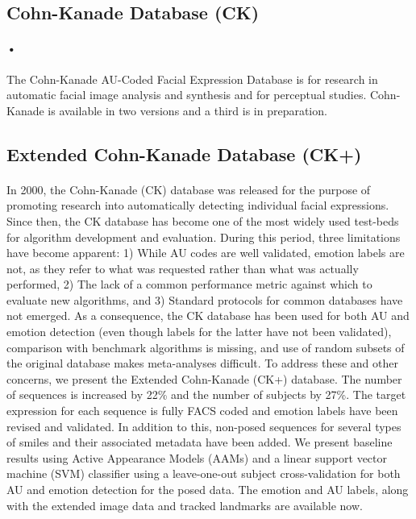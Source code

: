 \documentclass[a4paper,12pt,oneside]{article}
\begin{document}
\subsection{Cohn-Kanade Database (CK)}

\paragraph{•}
The Cohn-Kanade AU-Coded Facial Expression Database is for research in automatic facial image analysis and synthesis and for perceptual studies. Cohn-Kanade is available in two versions and a third is in preparation.



\subsection{Extended Cohn-Kanade Database (CK+)}
\paragraph{}
In 2000, the Cohn-Kanade (CK) database was released for the purpose of promoting research into automatically detecting individual facial expressions. Since then, the CK database has become one of the most widely used test-beds for algorithm development and evaluation. During this period, three limitations have become apparent: 1) While AU codes are well validated, emotion labels are not, as they refer to what was requested rather than what was actually performed, 2) The lack of a common performance metric against which to evaluate new algorithms, and 3) Standard protocols for common databases have not emerged. As a consequence, the CK database has been used for both AU and emotion detection (even though labels for the latter have not been validated), comparison with benchmark algorithms is missing, and use of random subsets of the original database makes meta-analyses difficult. To address these and other concerns, we present the Extended Cohn-Kanade (CK+) database. The number of sequences is increased by 22\% and the number of subjects by 27\%. The target expression for each sequence is fully FACS coded and emotion labels have been revised and validated. In addition to this, non-posed sequences for several types of smiles and their associated metadata have been added. We present baseline results using Active Appearance Models (AAMs) and a linear support vector machine (SVM) classifier using a leave-one-out subject cross-validation for both AU and emotion detection for the posed data. The emotion and AU labels, along with the extended image data and tracked landmarks are available now.
\end{document}
